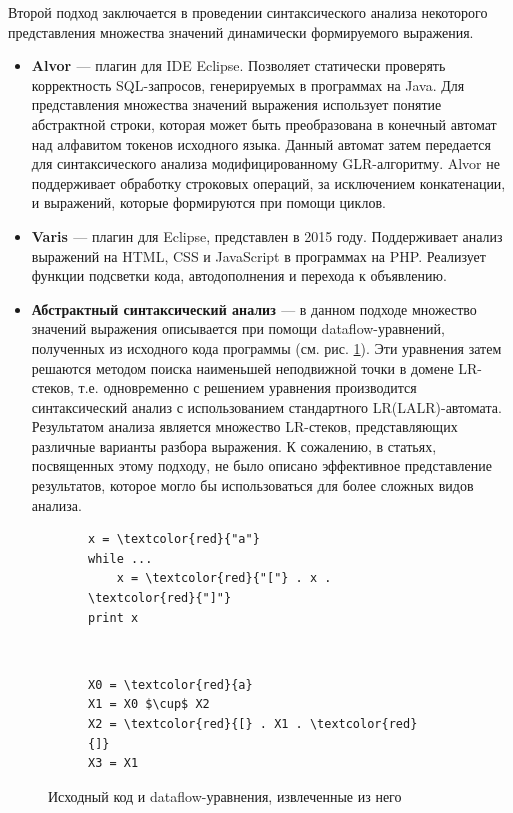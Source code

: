 \documentclass[14pt]{matmex-diploma-custom}
\begin{document}
Второй подход заключается в проведении синтаксического анализа некоторого представления множества значений динамически формируемого выражения.

\begin{itemize}
    \item \textbf{Alvor \cite{alvor}} --- плагин для IDE Eclipse. Позволяет статически проверять корректность SQL-запросов, генерируемых в программах на Java. Для представления множества значений выражения использует понятие абстрактной строки, которая может быть преобразована в конечный автомат над алфавитом токенов исходного языка. Данный автомат затем передается для синтаксического анализа модифицированному GLR-алгоритму. Alvor не поддерживает обработку строковых операций, за исключением конкатенации, и выражений, которые формируются при помощи циклов.
    \item \textbf{Varis \cite{varis}} --- плагин для Eclipse, представлен в 2015 году. Поддерживает анализ выражений на HTML, CSS и JavaScript в программах на PHP. Реализует функции подсветки кода, автодополнения и перехода к объявлению. 
    \item \textbf{Абстрактный синтаксический анализ \cite{a_lr}} --- в данном подходе множество значений выражения описывается при помощи dataflow-уравнений, полученных из исходного кода программы (см. рис. \ref{dataflow_ex}). Эти уравнения затем решаются методом поиска наименьшей неподвижной точки в домене LR-стеков, т.е. одновременно с решением уравнения производится синтаксический анализ с использованием стандартного LR(LALR)-автомата. Результатом анализа является множество LR-стеков, представляющих различные варианты разбора выражения. К сожалению, в статьях, посвященных этому подходу, не было описано эффективное представление результатов, которое могло бы использоваться для более сложных видов анализа.
\end{itemize}

\begin{figure}[h]
    \centering
    \begin{subfigure}{0.45\textwidth}
        \centering
        \begin{minipage}{4cm}
	        \begin{BVerbatim}[commandchars=\\\{\}]
x = \textcolor{red}{"a"}
while ...
    x = \textcolor{red}{"["} . x . \textcolor{red}{"]"}
print x
		    \end{BVerbatim}	
	    \end{minipage}
	\end{subfigure}
	~
	\begin{subfigure}{0.45\textwidth}
	    \centering
	    \begin{minipage}{4cm}
		    \begin{BVerbatim}[commandchars=\\\{\}, codes={\catcode`$=3}]
X0 = \textcolor{red}{a} 
X1 = X0 $\cup$ X2
X2 = \textcolor{red}{[} . X1 . \textcolor{red}{]}
X3 = X1 
		    \end{BVerbatim}
		\end{minipage}
	\end{subfigure}
	\caption{Исходный код и dataflow-уравнения, извлеченные из него}
	\label{dataflow_ex}
\end{figure}
\end{document}
